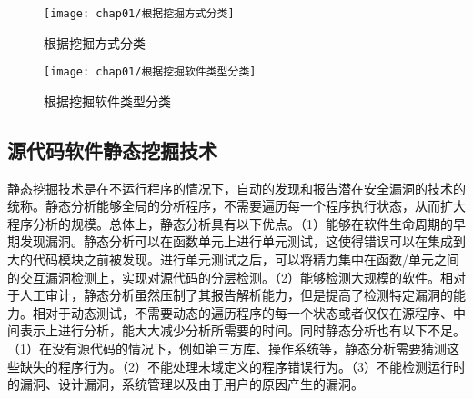 \begin{figure}[htb]
\begin{center}
\texttt{[image: chap01/根据挖掘方式分类]}
\end{center}
\caption{根据挖掘方式分类}
\label{根据挖掘方式分类}
\end{figure}


\begin{figure}[htb]
\begin{center}
\texttt{[image: chap01/根据挖掘软件类型分类]}
\end{center}
\caption{根据挖掘软件类型分类}
\label{根据挖掘软件类型分类}
\end{figure}
\subsection{源代码软件静态挖掘技术}

静态挖掘技术是在不运行程序的情况下，自动的发现和报告潜在安全漏洞的技术的统称。静态分析能够全局的分析程序，不需要遍历每一个程序执行状态，从而扩大程序分析的规模。总体上，静态分析具有以下优点。（1）能够在软件生命周期的早期发现漏洞。静态分析可以在函数单元上进行单元测试，这使得错误可以在集成到大的代码模块之前被发现。进行单元测试之后，可以将精力集中在函数/单元之间的交互漏洞检测上，实现对源代码的分层检测。（2）能够检测大规模的软件。相对于人工审计，静态分析虽然压制了其报告解析能力，但是提高了检测特定漏洞的能力。相对于动态测试，不需要动态的遍历程序的每一个状态或者仅仅在源程序、中间表示上进行分析，能大大减少分析所需要的时间。同时静态分析也有以下不足。（1）在没有源代码的情况下，例如第三方库、操作系统等，静态分析需要猜测这些缺失的程序行为。（2）不能处理未域定义的程序错误行为。（3）不能检测运行时的漏洞、设计漏洞，系统管理以及由于用户的原因产生的漏洞。

%
%

